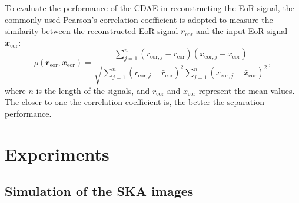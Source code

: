 \documentclass[fleqn,usenatbib]{mnras}
\newcommand{\R}[1]{\mathrm{#1}}
\newcommand{\B}[1]{\mathbfit{#1}}
\begin{document}
To evaluate the performance of the CDAE in reconstructing the EoR signal,
the commonly used Pearson's correlation coefficient
\citep[e.g.,][]{harker2009,chapman2013}
is adopted to measure the similarity between the reconstructed EoR
signal $\B{r}_{\R{eor}}$ and the input EoR signal $\B{x}_{\R{eor}}$:
\begin{equation}
  \label{eq:corrcoef}
  \rho(\B{r}_{\R{eor}}, \B{x}_{\R{eor}})
      = \frac{\sum_{j=1}^{n}(r_{\R{eor},j} - \bar{r}_{\R{eor}})
      (x_{\R{eor},j} - \bar{x}_{\R{eor}})}{
        \sqrt{\sum_{j=1}^{n}(r_{\R{eor},j} - \bar{r}_{\R{eor}})^2
          \sum_{j=1}^{n}(x_{\R{eor},j} - \bar{x}_{\R{eor}})^2}
    },
\end{equation}
where $n$ is the length of the signals,
and $\bar{r}_{\R{eor}}$ and $\bar{x}_{\R{eor}}$ represent the mean values.
The closer to one the correlation coefficient is, the better the separation
performance.


\section{Experiments}
\label{sec:experiments}

\subsection{Simulation of the SKA images}
\label{sec:simulation}
\end{document}
